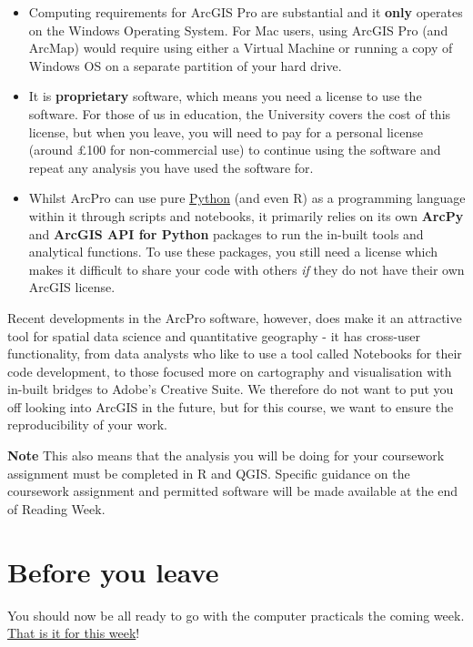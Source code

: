 \documentclass[
]{book}
\providecommand{\tightlist}{%
  \setlength{\itemsep}{0pt}\setlength{\parskip}{0pt}}
\begin{document}
\begin{itemize}
\tightlist
\item
  Computing requirements for ArcGIS Pro are substantial and it \textbf{only} operates on the Windows Operating System. For Mac users, using ArcGIS Pro (and ArcMap) would require using either a Virtual Machine or running a copy of Windows OS on a separate partition of your hard drive.
\item
  It is \textbf{proprietary} software, which means you need a license to use the software. For those of us in education, the University covers the cost of this license, but when you leave, you will need to pay for a personal license (around £100 for non-commercial use) to continue using the software and repeat any analysis you have used the software for.
\item
  Whilst ArcPro can use pure \href{https://www.python.org/}{Python} (and even R) as a programming language within it through scripts and notebooks, it primarily relies on its own \textbf{ArcPy} and \textbf{ArcGIS API for Python} packages to run the in-built tools and analytical functions. To use these packages, you still need a license which makes it difficult to share your code with others \emph{if} they do not have their own ArcGIS license.
\end{itemize}

Recent developments in the ArcPro software, however, does make it an attractive tool for spatial data science and quantitative geography - it has cross-user functionality, from data analysts who like to use a tool called Notebooks for their code development, to those focused more on cartography and visualisation with in-built bridges to Adobe's Creative Suite. We therefore do not want to put you off looking into ArcGIS in the future, but for this course, we want to ensure the reproducibility of your work.

\textbf{Note} This also means that the analysis you will be doing for your coursework assignment must be completed in R and QGIS. Specific guidance on the coursework assignment and permitted software will be made available at the end of Reading Week.

\hypertarget{byl-w01}{%
\section{Before you leave}\label{byl-w01}}

You should now be all ready to go with the computer practicals the coming week. \href{https://www.youtube.com/watch?v=d8Fmu3RLEOY}{That is it for this week}!
\end{document}
